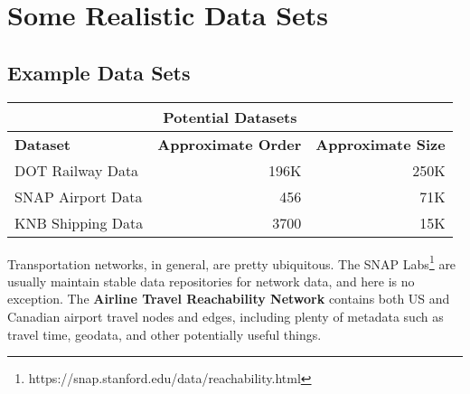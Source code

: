 \section{Some Realistic Data Sets}\label{sec:basic-datasets-\myInitials}

\subsection{Example Data Sets}

\begin{table}
    \centering
    \begin{tabular}{lll}
        \multicolumn{3}{c}{{\color[HTML]{343434} \textbf{Potential Datasets}}}                                               \\ \hline
        \multicolumn{1}{|l|}{\textbf{Dataset}}  & \multicolumn{1}{l|}{\textbf{Approximate Order}} & \multicolumn{1}{l|}{\textbf{Approximate Size}}   \\ \hline
        \multicolumn{1}{|l|}{DOT Railway Data}  & \multicolumn{1}{r|}{196K}           & \multicolumn{1}{r|}{250K} \\ \hline
        \multicolumn{1}{|l|}{SNAP Airport Data} & \multicolumn{1}{r|}{456}            & \multicolumn{1}{r|}{71K}       \\ \hline
        \multicolumn{1}{|l|}{KNB Shipping Data} & \multicolumn{1}{r|}{3700}     & \multicolumn{1}{r|}{15K}       \\ \hline
    \end{tabular}
    \label{table:potential_datasets}
\end{table}

Transportation networks, in general, are pretty ubiquitous. The SNAP Labs\footnote{\cite{snapnets}https://snap.stanford.edu/data/reachability.html} are usually maintain stable data repositories for network data, and here is no exception. The \textbf{Airline Travel Reachability Network} contains both US and Canadian airport travel nodes and edges, including plenty of metadata such as travel time, geodata, and other potentially useful things. 

